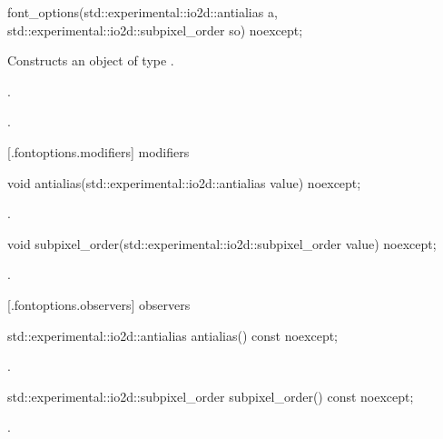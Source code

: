 \begin{itemdecl}
    font_options(std::experimental::io2d::antialias a,
      std::experimental::io2d::subpixel_order so) noexcept;
\end{itemdecl}
\begin{itemdescr}
	\pnum
	\effects
	Constructs an object of type .
	
	\pnum
	\postconditions
	.
	
	.
	
\end{itemdescr}

 [\iotwod.fontoptions.modifiers] { modifiers}

\begin{itemdecl}
    void antialias(std::experimental::io2d::antialias value) noexcept;
\end{itemdecl}
\begin{itemdescr}
	\pnum
	\postconditions
	.
	
\end{itemdescr}

\begin{itemdecl}
    void subpixel_order(std::experimental::io2d::subpixel_order value) noexcept;
\end{itemdecl}
\begin{itemdescr}
	\pnum
	\postconditions
	.
	
\end{itemdescr}

 [\iotwod.fontoptions.observers] { observers}

\begin{itemdecl}
std::experimental::io2d::antialias antialias() const noexcept;
\end{itemdecl}
\begin{itemdescr}
	\pnum
	\returns
	.

\end{itemdescr}

\begin{itemdecl}
std::experimental::io2d::subpixel_order subpixel_order() const noexcept;
\end{itemdecl}
\begin{itemdescr}
	\pnum
	\returns
	.
	
\end{itemdescr}
